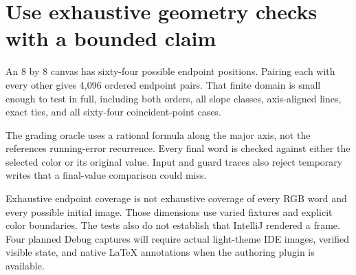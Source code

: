 \section{Use exhaustive geometry checks with a bounded
  claim}\label{007-bresenham-line-p12-use-exhaustive-geometry-checks-with-a-bounded-claim}

An 8 by 8 canvas has sixty-four possible endpoint positions. Pairing
each with every other gives 4,096 ordered endpoint pairs. That finite
domain is small enough to test in full, including both orders, all slope
classes, axis-aligned lines, exact ties, and all sixty-four
coincident-point cases.

The grading oracle uses a rational formula along the major axis, not the
reference\textquotesingle s running-error recurrence. Every final word
is checked against either the selected color or its original value.
Input and guard traces also reject temporary writes that a final-value
comparison could miss.

Exhaustive endpoint coverage is not exhaustive coverage of every RGB
word and every possible initial image. Those dimensions use varied
fixtures and explicit color boundaries. The tests also do not establish
that IntelliJ rendered a frame. Four planned Debug captures will require
actual light-theme IDE images, verified visible state, and native LaTeX
annotations when the authoring plugin is available.
